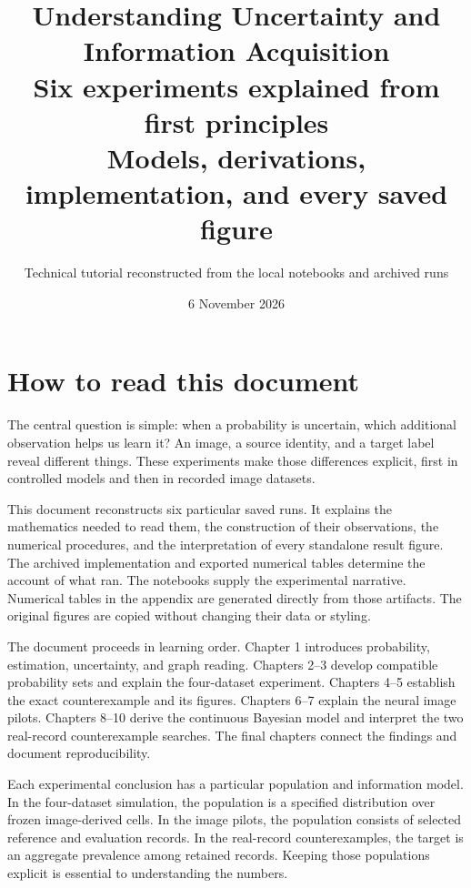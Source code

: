 \documentclass[11pt,a4paper]{report}
\title{Understanding Uncertainty and Information Acquisition\\\large Six experiments explained from first principles\\Models, derivations, implementation, and every saved figure}
\author{Technical tutorial reconstructed from the local notebooks and archived runs}
\date{6 November 2026}
\begin{document}
\hypersetup{pageanchor=false}
\maketitle
\hypersetup{pageanchor=true}
\chapter*{How to read this document}
The central question is simple: when a probability is uncertain, which additional observation helps us learn it? An image, a source identity, and a target label reveal different things. These experiments make those differences explicit, first in controlled models and then in recorded image datasets.

This document reconstructs six particular saved runs. It explains the mathematics needed to read them, the construction of their observations, the numerical procedures, and the interpretation of every standalone result figure. The archived implementation and exported numerical tables determine the account of what ran. The notebooks supply the experimental narrative. Numerical tables in the appendix are generated directly from those artifacts. The original figures are copied without changing their data or styling.

The document proceeds in learning order. Chapter 1 introduces probability, estimation, uncertainty, and graph reading. Chapters 2--3 develop compatible probability sets and explain the four-dataset experiment. Chapters 4--5 establish the exact counterexample and its figures. Chapters 6--7 explain the neural image pilots. Chapters 8--10 derive the continuous Bayesian model and interpret the two real-record counterexample searches. The final chapters connect the findings and document reproducibility.

Each experimental conclusion has a particular population and information model. In the four-dataset simulation, the population is a specified distribution over frozen image-derived cells. In the image pilots, the population consists of selected reference and evaluation records. In the real-record counterexamples, the target is an aggregate prevalence among retained records. Keeping those populations explicit is essential to understanding the numbers.
\end{document}
